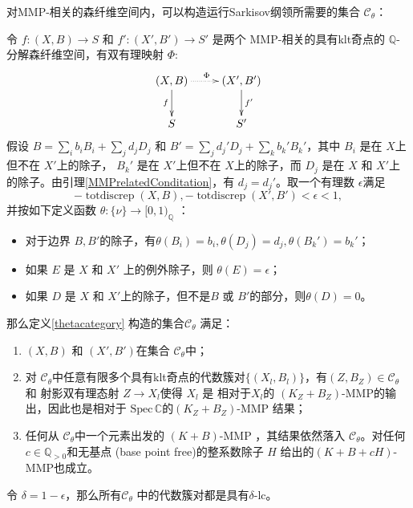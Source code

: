  对MMP-相关的森纤维空间内，可以构造运行Sarkisov纲领所需要的集合 $\mathcal{C}_{\theta} $：
\begin{proposition}\cite[Lemma 3.6]{brunoLogSarkisovProgram1995}\label{cat}
  令 $ f:(X,B)\to S$ 和 $f':(X',B')\to S' $ 是两个 MMP-相关的具有klt奇点的 $ \mathbb{Q} $-分解森纤维空间，有双有理映射 $\Phi$:
  \[ \xymatrix{
      {(X,B)}\ar[d]_{f}\ar@{.>}[r]^\Phi&(X',B')\ar[d]^{f'}\\
      S&S'} \]
假设 $ B=\sum_{i}b_{i}B_{i}+\sum_{j}d_{j}D_j $ 和 $ B'=\sum_{j}d_{j}'D_{j}+\sum_{k}b_{k}'B_{k}' $，其中 $ B_{i} $ 是在 $ X $上但不在 $ X' $上的除子， $ B_k' $ 是在 $ X' $上但不在  $ X $上的除子，而 $ D_j $ 是在 $ X $ 和 $ X' $上的除子。由引理\ref{MMPrelatedConditation}，有 $ d_{j}=d_{j}' $。取一个有理数 $\epsilon$满足 
\[ -\operatorname{totdiscrep}(X,B),-\operatorname{totdiscrep}(X',B')  <\epsilon <1 ,\]
并按如下定义函数 $ \theta: \{ \nu \} \to [0,1)_{\mathbb{Q}} $ ：
  \begin{itemize}
    \item 对于边界  $B,B'$的除子，有$ \theta(B_i)=b_i, \theta(D_{j})=d_{j},\theta(B_{k}')=b_{k}'$；
    \item  如果 $E$ 是 $X$ 和 $X'$ 上的例外除子，则    $ \theta(E)=\epsilon $；
    \item   如果 $ D $ 是 $ X $ 和 $ X' $上的除子，但不是$ B $ 或 $ B' $的部分，则$ \theta(D)=0 $。
  \end{itemize}
  那么定义\ref{thetacategory} 构造的集合$ \mathcal{C}_{\theta} $ 满足：
  \begin{enumerate}
    \item $ (X,B) $ 和 $ (X',B') $在集合 $ \mathcal{C}_{\theta} $中；
    \item   对 $ \mathcal{C}_{\theta} $中任意有限多个具有klt奇点的代数簇对$ \{(X_l,B_l)\} $，有$ (Z,B_Z)\in \mathcal{C}_{\theta} $ 和 射影双有理态射 $ Z\to X_l $使得 $X_{l}$ 是 相对于$X_{l}$的   $ (K_{Z}+B_{Z}) $-MMP的输出，因此也是相对于 $ \mathrm{Spec}\,\mathbb{C} $的$(K_Z+B_Z)$-MMP 结果；
    \item 任何从  $ \mathcal{C}_{\theta} $中一个元素出发的 $ (K+B) $-MMP ，其结果依然落入 $ \mathcal{C}_{\theta} $。对任何$ c\in \mathbb{Q}_{>0} $和无基点 (base point free)的整系数除子 $H$ 给出的$ (K+B+cH) $-MMP也成立。
  \end{enumerate}
\end{proposition}
\begin{remark}\label{delta-lc}
  令 $\delta=1-\epsilon$，那么所有$\mathcal{C}_{\theta}$ 中的代数簇对都是具有$\delta$-lc。
\end{remark}

